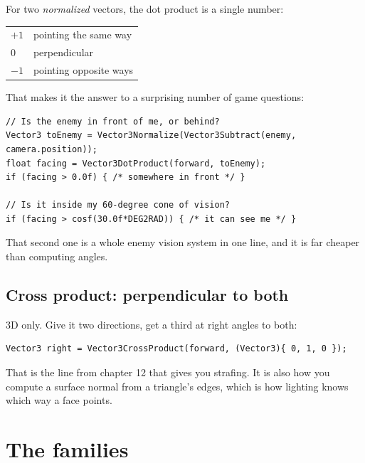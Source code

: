 For two \emph{normalized} vectors, the dot product is a single number:

\begin{center}
\begin{tabular}{@{}ll@{}}
\toprule
$+1$ & pointing the same way \\
$0$ & perpendicular \\
$-1$ & pointing opposite ways \\
\bottomrule
\end{tabular}
\end{center}

That makes it the answer to a surprising number of game questions:

\begin{lstlisting}
// Is the enemy in front of me, or behind?
Vector3 toEnemy = Vector3Normalize(Vector3Subtract(enemy, camera.position));
float facing = Vector3DotProduct(forward, toEnemy);
if (facing > 0.0f) { /* somewhere in front */ }

// Is it inside my 60-degree cone of vision?
if (facing > cosf(30.0f*DEG2RAD)) { /* it can see me */ }
\end{lstlisting}

That second one is a whole enemy vision system in one line, and it is far cheaper
than computing angles.

\subsection{Cross product: perpendicular to both}

3D only. Give it two directions, get a third at right angles to both:

\begin{lstlisting}
Vector3 right = Vector3CrossProduct(forward, (Vector3){ 0, 1, 0 });
\end{lstlisting}

That is the line from chapter 12 that gives you strafing. It is also how you
compute a surface normal from a triangle's edges, which is how lighting knows
which way a face points.


\section{The families}

